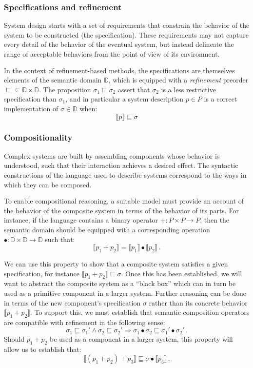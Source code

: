 \documentclass[acmsmall,timestamp,review]{acmart}
\begin{document}
\subsubsection{Specifications and refinement}

System design starts with a set of requirements
that constrain the behavior of the system to be constructed
(the specification).
These requirements may not capture every detail
of the behavior of the eventual system,
but instead delineate the range of acceptable behaviors
from the point of view of its environment.

In the context of refinement-based methods,
the specifications are themselves elements of
the semantic domain $\mathbb{D}$,
which is equipped with a \emph{refinement} preorder
${\sqsubseteq} \subseteq \mathbb{D} \times \mathbb{D}$.
The proposition $\sigma_1 \sqsubseteq \sigma_2$
assert that $\sigma_2$ is a less restrictive specification than $\sigma_1$,
and in particular a system description $p \in P$ is a correct implementation
of $\sigma \in \mathbb{D}$ when:
\[ \llbracket p \rrbracket \sqsubseteq \sigma \]

\subsubsection{Compositionality}

Complex systems are built by assembling components
whose behavior is understood,
such that their interaction achieves a desired effect.
The syntactic constructions of
the language used to describe systems
correspond to the ways in which they can be composed.

To enable compositional reasoning,
a suitable model must provide an account of
the behavior of the composite system
in terms of the behavior of its parts.
For instance,
if the language contains a binary operator
${+} : P \times P \rightarrow P$,
then the semantic domain should be equipped with
a corresponding operation
${\bullet} : \mathbb{D} \times \mathbb{D} \rightarrow \mathbb{D}$
such that:
\[ \llbracket p_1 + p_2 \rrbracket =
   \llbracket p_1 \rrbracket \bullet \llbracket p_2 \rrbracket \,. \]

We can use this property
to show that a composite system
satisfies a given specification,
for instance
$\llbracket p_1 + p_2 \rrbracket \sqsubseteq \sigma$.
Once this has been established,
we will want to abstract the composite system as a ``black box''
which can in turn be used as a primitive component in a larger system.
Further reasoning can be done in terms of
the new component's specification $\sigma$ rather than
its concrete behavior $\llbracket p_1 + p_2 \rrbracket$.
To support this,
we must establish that semantic composition operators
are compatible with refinement in the following sense:
\[ \sigma_1 \sqsubseteq \sigma_1' \wedge
   \sigma_2 \sqsubseteq \sigma_2' \Rightarrow
   \sigma_1 \bullet \sigma_2 \sqsubseteq \sigma_1' \bullet \sigma_2' \,. \]
Should $p_1 + p_2$ be used as a component in a larger system,
this property will allow us to establish that:
\[ \llbracket (p_1 + p_2) + p_3 \rrbracket \sqsubseteq
   \sigma \bullet \llbracket p_3 \rrbracket \,. \]
\end{document}
